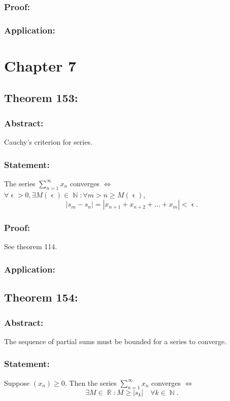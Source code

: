 \documentclass{article}
\DeclareMathOperator\eps{\epsilon}
\DeclareMathOperator\R{\mathbb{R}}
\DeclareMathOperator\N{\mathbb{N}}
\begin{document}
\subsubsection*{Proof:}

\subsubsection*{Application:}

\section*{Chapter 7}
\subsection{Theorem 153:}
\subsubsection*{Abstract:}
Cauchy's criterion for series.
\subsubsection*{Statement:}
The series $\sum_{n=1}^{\infty}x_n$ converges $\iff$ \\
\newline
$\forall \eps>0, \exists M(\eps) \in \N: \forall m>n \geq M(\eps)$, $$
|s_m-s_n| = |x_{n+1}+x_{n+2}+...+x_{m}| < \eps.
$$
\subsubsection*{Proof:}
See theorem 114.
\subsubsection*{Application:}
\subsection{Theorem 154:}
\subsubsection*{Abstract:}
The sequence of partial sums must be bounded for a series to converge.
\subsubsection*{Statement:}
Suppose $(x_n) \geq 0$. Then the series $\sum_{n=1}^{\infty}x_n$ converges $\iff$ \\
\newline
$$\exists M \in \R: M \geq |s_k| \quad \forall k \in \N.$$
\end{document}

